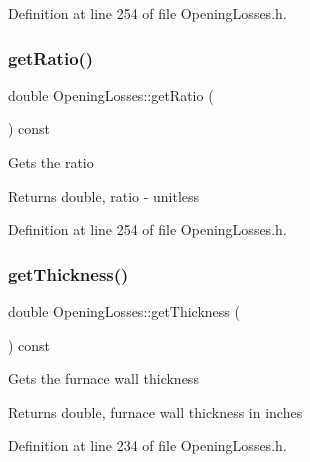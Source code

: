 Definition at line 254 of file Opening\+Losses.\+h.

\mbox{\label{class_opening_losses_ac9f7dbd2cc023932b5d8076a21a3f690}} 
\subsubsection{\texorpdfstring{get\+Ratio()}{getRatio()}\hspace{0.1cm}{\footnotesize\ttfamily [3/3]}}
{\footnotesize\ttfamily double Opening\+Losses\+::get\+Ratio (\begin{DoxyParamCaption}{ }\end{DoxyParamCaption}) const\hspace{0.3cm}{\ttfamily [inline]}}

Gets the ratio

\begin{DoxyReturn}{Returns}
double, ratio -\/ unitless 
\end{DoxyReturn}


Definition at line 254 of file Opening\+Losses.\+h.

\mbox{\label{class_opening_losses_aeefdf4431056de65ca84c6dfb24b61e1}} 
\subsubsection{\texorpdfstring{get\+Thickness()}{getThickness()}\hspace{0.1cm}{\footnotesize\ttfamily [1/3]}}
{\footnotesize\ttfamily double Opening\+Losses\+::get\+Thickness (\begin{DoxyParamCaption}{ }\end{DoxyParamCaption}) const\hspace{0.3cm}{\ttfamily [inline]}}

Gets the furnace wall thickness

\begin{DoxyReturn}{Returns}
double, furnace wall thickness in inches 
\end{DoxyReturn}


Definition at line 234 of file Opening\+Losses.\+h.

